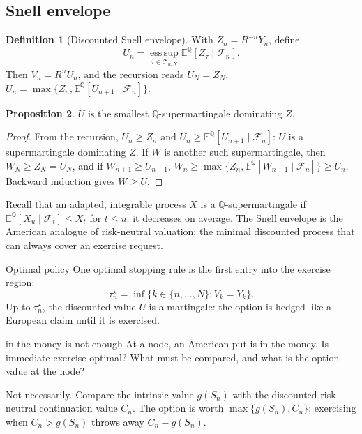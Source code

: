 \documentclass[10pt]{article}
\newcommand{\E}{\mathbb E}
\newcommand{\Q}{\mathbb Q}
\newcommand{\1}{\mathbf 1}
\newcommand{\cF}{\mathcal F}
\newcommand{\esssup}{\operatorname*{ess\,sup}}
\theoremstyle{definition}
\newtheorem{definition}{Definition}[section]
\newtheorem{proposition}[definition]{Proposition}
\begin{document}
\subsection{Snell envelope}

\begin{definition}[Discounted Snell envelope]
With \(Z_n=R^{-n}Y_n\), define
\[
U_n=\esssup_{\tau\in\mathcal T_{n,N}}\E^\Q[Z_\tau\mid\cF_n].
\]
Then \(V_n=R^nU_n\), and the recursion reads
\(U_N=Z_N\), \(U_n=\max\{Z_n,\E^\Q[U_{n+1}\mid\cF_n]\}\).
\end{definition}

\begin{proposition}
\(U\) is the smallest \(\Q\)-supermartingale dominating \(Z\).
\end{proposition}
\begin{proof}
From the recursion, \(U_n\geq Z_n\) and \(U_n\geq\E^\Q[U_{n+1}\mid\cF_n]\):
\(U\) is a supermartingale dominating \(Z\). If \(W\) is another such
supermartingale, then \(W_N\geq Z_N=U_N\), and if \(W_{n+1}\geq U_{n+1}\),
\(W_n\geq\max\{Z_n,\E^\Q[W_{n+1}\mid\cF_n]\}\geq U_n\). Backward induction
gives \(W\geq U\).
\end{proof}

Recall that an adapted, integrable process \(X\) is a \(\Q\)-supermartingale
if \(\E^\Q[X_u\mid\cF_t]\leq X_t\) for \(t\leq u\): it decreases on
average. The Snell envelope is the American analogue of risk-neutral
valuation: the minimal discounted process that can always cover an exercise
request.

\begin{keyidea}{Optimal policy}
One optimal stopping rule is the first entry into the exercise region:
\[
\tau_n^\star=\inf\{k\in\{n,\ldots,N\}:V_k=Y_k\}.
\]
Up to \(\tau_n^\star\), the discounted value \(U\) is a martingale: the option
is hedged like a European claim until it is exercised.
\end{keyidea}

\begin{studentexercise}{in the money is not enough}
At a node, an American put is in the money. Is immediate exercise optimal?
What must be compared, and what is the option value at the node?
\end{studentexercise}
\begin{shortsolution}
Not necessarily. Compare the intrinsic value \(g(S_n)\) with the discounted
risk-neutral continuation value \(C_n\). The option is worth
\(\max\{g(S_n),C_n\}\); exercising when \(C_n>g(S_n)\) throws away
\(C_n-g(S_n)\).
\end{shortsolution}
\end{document}
